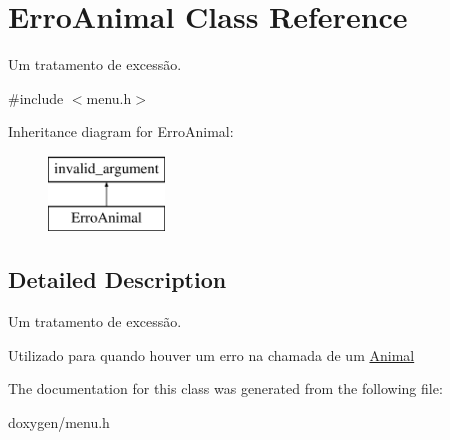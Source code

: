 \hypertarget{class_erro_animal}{}\section{Erro\+Animal Class Reference}
\label{class_erro_animal}


Um tratamento de excessão.  




{\ttfamily \#include $<$menu.\+h$>$}

Inheritance diagram for Erro\+Animal\+:\begin{figure}[H]
\begin{center}
\leavevmode
\includegraphics[height=2.000000cm]{class_erro_animal}
\end{center}
\end{figure}


\subsection{Detailed Description}
Um tratamento de excessão. 

Utilizado para quando houver um erro na chamada de um \mbox{\hyperlink{class_animal}{Animal}} 

The documentation for this class was generated from the following file\+:\begin{DoxyCompactItemize}
\item 
doxygen/menu.\+h\end{DoxyCompactItemize}
